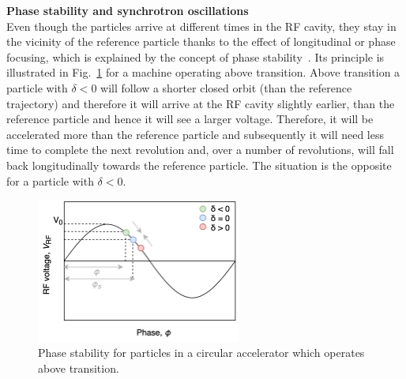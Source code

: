 \textbf{Phase stability and synchrotron oscillations}\\
Even though the particles arrive at different times in the RF cavity, they stay in the vicinity of the reference particle thanks to the effect of longitudinal or phase focusing, which is explained by the concept of phase stability~\cite{McMillan:1945zz, Veksler_1, Veksler_2}. Its principle is illustrated in Fig.~\ref{fig:phase_focusing} for a machine operating above transition. Above transition a particle with $\delta<0$ will follow a shorter closed orbit (than the reference trajectory) and therefore it will arrive at the RF cavity slightly earlier, than the reference particle and hence it will see a larger voltage. Therefore, it will be accelerated more than the reference particle and subsequently it will need less time to complete the next revolution and, over a number of revolutions, will fall back longitudinally towards the reference particle. The situation is the opposite for a particle with $\delta<0$. 
\begin{figure}[!h] %
    \centering         
    \includegraphics[width=0.6\textwidth]{images/Ch2/phase_focusing_synchrotron_motion.png}
        \caption{Phase stability for particles in a circular accelerator which operates above transition.}
        \label{fig:phase_focusing}
 \end{figure}


